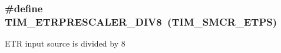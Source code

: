 \subsubsection[{\texorpdfstring{T\+I\+M\+\_\+\+E\+T\+R\+P\+R\+E\+S\+C\+A\+L\+E\+R\+\_\+\+D\+I\+V8}{TIM_ETRPRESCALER_DIV8}}]{\setlength{\rightskip}{0pt plus 5cm}\#define T\+I\+M\+\_\+\+E\+T\+R\+P\+R\+E\+S\+C\+A\+L\+E\+R\+\_\+\+D\+I\+V8~({\bf T\+I\+M\+\_\+\+S\+M\+C\+R\+\_\+\+E\+T\+PS})}\hypertarget{group___t_i_m___e_t_r___prescaler_ga834e38200874cced108379b17a24d0b7}{}\label{group___t_i_m___e_t_r___prescaler_ga834e38200874cced108379b17a24d0b7}
E\+TR input source is divided by 8 